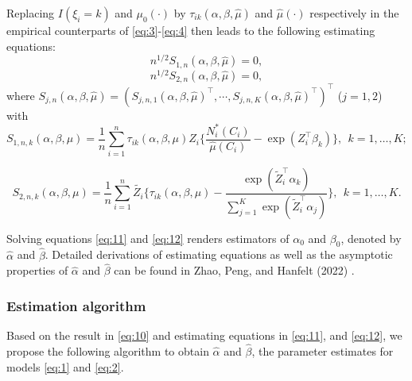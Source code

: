 Replacing \(I(\xi_i=k)\) and \(\mu_0(\cdot)\) by \(\tau_{ik}(\alpha, \beta, \hat\mu)\) and \(\hat\mu(\cdot)\) respectively in the empirical counterparts of \eqref{eq:3}-\eqref{eq:4} then leads to the following estimating equations:
\begin{equation} 
\label{eq:11}
n^{1/2} S_{1,n}(\alpha, \beta, \hat{\mu}) = 0,
\end{equation}
\begin{equation} 
\label{eq:12}
n^{1/2} S_{2,n}(\alpha, \beta, \hat{\mu}) = 0,
\end{equation}
where
\(S_{j,n} (\alpha, \beta, \hat{\mu}) = ( S_{j,n,1} (\alpha, \beta, \hat{\mu})^{\top}, \cdots , S_{j,n,K} (\alpha, \beta, \hat{\mu})^{\top} )^{\top}\)
(\(j = 1,2\))
with
\begin{equation}
S_{1,n,k}(\alpha, \beta, \mu) = \frac{1}{n}\sum _{i = 1} ^{n} \tau_{ik}(\alpha, \beta, \mu) Z_{i} \{ \frac{N_i ^{*} (C _{i})}{\hat\mu(C_{i})} - \exp(Z_{i} ^{\top} \beta_{k})\},\ \ k=1,\ldots, K;
\end{equation}

\begin{equation}
S_{2,n,k}(\alpha, \beta, \mu) = \frac{1}{n}\sum _{i = 1} ^{n}  \tilde{Z_{i}} \{ \tau_{ik}(\alpha, \beta, \mu) - \frac{\exp(\tilde{Z} _{i} ^{\top} \alpha _{k})}{\sum _{j = 1} ^{K} \exp(\tilde{Z} _{i} ^{\top} \alpha _{j})}\},\ \ k=1,\ldots, K.
\end{equation}

Solving equations \eqref{eq:11} and \eqref{eq:12} renders estimators of \(\alpha_0\) and \(\beta_0\), denoted by \(\hat\alpha\) and \(\hat\beta\). Detailed derivations of estimating equations as well as the asymptotic
properties of \(\hat\alpha\) and \(\hat\beta\) can be found in Zhao, Peng, and Hanfelt (2022) .

\hypertarget{estimation-algorithm}{%
\subsubsection{Estimation algorithm}\label{estimation-algorithm}}

Based on the result in \eqref{eq:10} and estimating equations in \eqref{eq:11}, and \eqref{eq:12}, we propose the following algorithm to obtain \(\hat\alpha\) and \(\hat\beta\), the parameter estimates for models \eqref{eq:1} and \eqref{eq:2}.

